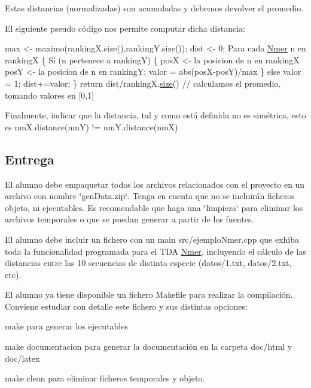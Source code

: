 Estas distancias (normalizadas) son acumuladas y debemos devolver el promedio.

El siguiente pseudo código nos permite computar dicha distancia\+: 
\begin{DoxyCode}
max <- maximo(rankingX.size(),rankingY.size());
dist <- 0;
Para cada \hyperlink{classNmer}{Nmer} n en rankingX \{
  Si (n pertenece a rankingY) \{
    posX <- la posicion de n en rankingX
    posY <- la posicion de n en rankingY;
    valor = abs(posX-posY)/max
  \} \textcolor{keywordflow}{else} valor = 1;
  dist+=valor;
\} 
\textcolor{keywordflow}{return} dist/rankingX.\hyperlink{classNmer_accdea65838fcd53c48a2d05f6809643f}{size}() \textcolor{comment}{// calculamos el promedio, tomando  valores en [0,1]}
\end{DoxyCode}


Finalmente, indicar que la distancia, tal y como está definida no es simétrica, esto es nm\+X.\+distance(nm\+Y) != nm\+Y.\+distance(nm\+X)\hypertarget{index_entrega}{}\subsection{Entrega}\label{index_entrega}
El alumno debe empaquetar todos los archivos relacionados con el proyecto en un archivo con nombre \char`\"{}gen\+Data.\+zip\char`\"{}. Tenga en cuenta que no se incluirán ficheros objeto, ni ejecutables. Es recomendable que haga una \char`\"{}limpieza\char`\"{} para eliminar los archivos temporales o que se puedan generar a partir de los fuentes.

El alumno debe incluir un fichero con un main {\ttfamily src/ejemplo\+Nmer.\+cpp} que exhiba toda la funcionalidad programada para el T\+DA \hyperlink{classNmer}{Nmer}, incluyendo el cálculo de las distancias entre las 10 secuencias de distinta especie ({\ttfamily datos/1.\+txt, datos/2.\+txt}, etc).

El alumno ya tiene disponible un fichero Makefile para realizar la compilación. Conviene estudiar con detalle este fichero y sus distintas opciones\+:
\begin{DoxyItemize}
\item {\ttfamily make} para generar los ejecutables
\item {\ttfamily make documentacion} para generar la documentación en la carpeta {\ttfamily doc/html} y {\ttfamily doc/latex}
\item {\ttfamily make clean} para eliminar ficheros temporales y objeto.
\end{DoxyItemize}

